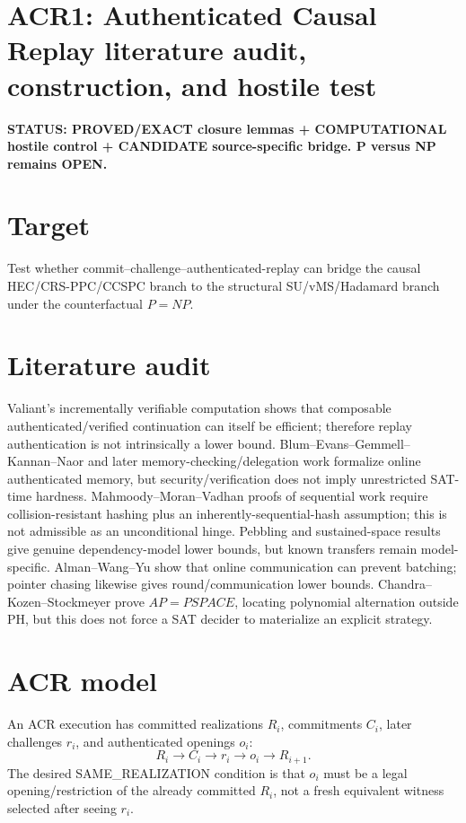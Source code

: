 \documentclass[11pt]{article}
\begin{document}
\section*{ACR1: Authenticated Causal Replay literature audit, construction, and hostile test}
\textbf{STATUS: PROVED/EXACT closure lemmas + COMPUTATIONAL hostile control + CANDIDATE source-specific bridge. P versus NP remains OPEN.}

\section*{Target}
Test whether commit--challenge--authenticated-replay can bridge the causal HEC/CRS-PPC/CCSPC branch to the structural SU/vMS/Hadamard branch under the counterfactual $P=NP$.

\section*{Literature audit}
Valiant's incrementally verifiable computation shows that composable authenticated/verified continuation can itself be efficient; therefore replay authentication is not intrinsically a lower bound. Blum--Evans--Gemmell--Kannan--Naor and later memory-checking/delegation work formalize online authenticated memory, but security/verification does not imply unrestricted SAT-time hardness. Mahmoody--Moran--Vadhan proofs of sequential work require collision-resistant hashing plus an inherently-sequential-hash assumption; this is not admissible as an unconditional hinge. Pebbling and sustained-space results give genuine dependency-model lower bounds, but known transfers remain model-specific. Alman--Wang--Yu show that online communication can prevent batching; pointer chasing likewise gives round/communication lower bounds. Chandra--Kozen--Stockmeyer prove $AP=PSPACE$, locating polynomial alternation outside PH, but this does not force a SAT decider to materialize an explicit strategy.

\section*{ACR model}
An ACR execution has committed realizations $R_i$, commitments $C_i$, later challenges $r_i$, and authenticated openings $o_i$:
\[
R_i\to C_i\to r_i\to o_i\to R_{i+1}.
\]
The desired SAME\_REALIZATION condition is that $o_i$ must be a legal opening/restriction of the already committed $R_i$, not a fresh equivalent witness selected after seeing $r_i$.
\end{document}
